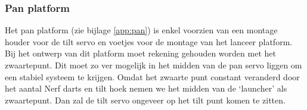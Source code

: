 \subsubsection{Pan platform}

Het pan platform (zie bijlage \ref{app:pan}) is enkel voorzien van een montage houder voor de tilt servo en
voetjes voor de montage van het lanceer platform.
Bij het ontwerp van dit platform moet rekening gehouden worden met het zwaartepunt. Dit
moet zo ver mogelijk in het midden van de pan servo liggen om een stabiel systeem te krijgen. Omdat
het zwaarte punt constant veranderd door het aantal Nerf darts en tilt hoek nemen we het
midden van de ‘launcher’ als zwaartepunt. Dan zal de tilt servo ongeveer op het tilt punt komen te
zitten.
